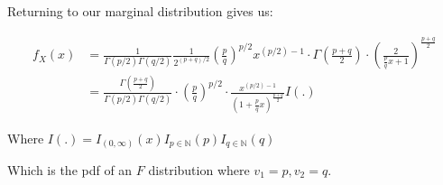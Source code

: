 Returning to our marginal distribution gives us:

\begin{align*}
	f_X(x) &= \frac{1}{\Gamma(p/2)\Gamma(q/2)} 
	\frac{1}{2^{(p+q)/2}} 
	\left( \frac{p}{q} \right)^{p/2} 
	x^{(p/2)-1} \cdot \Gamma\left( \frac{p+q}{2} \right) \cdot \left( \frac{2}{\frac{p}{q}x + 1} \right)^{\frac{p+q}{2}} \\
	&= \frac{\Gamma\left( \frac{p+q}{2} \right)}{\Gamma(p/2)\Gamma(q/2)} \cdot \left( \frac{p}{q} \right)^{p/2} \cdot 
	\frac{x^{(p/2)-1}}{\left(1+ \frac{p}{q}x\right)^{\frac{p+q}{2}}} I(.)
\end{align*}

Where $I(.) = I_{(0,\infty)}(x)I_{p \in \mathbb{N}}(p)I_{q \in \mathbb{N}}(q)$

Which is the pdf of an $F$ distribution where $v_1=p, v_2=q$. 